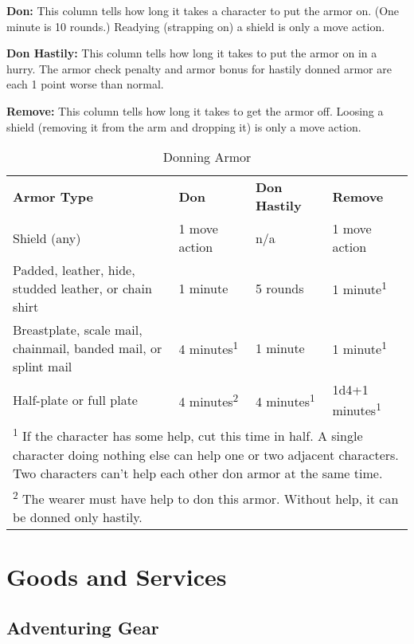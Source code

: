 \textbf{Don:} This column tells how long it takes a character to put the armor 
on. (One minute is 10 rounds.) Readying (strapping on) a shield is only a move 
action.

\textbf{Don Hastily:} This column tells how long it takes to put the armor on in 
a hurry. The armor check penalty and armor bonus for hastily donned armor are each 
1 point worse than normal. 

\textbf{Remove:} This column tells how long it takes to get the armor off. Loosing 
a shield (removing it from the arm and dropping it) is only a move action.


\begin{table}[htb]
\caption{Donning Armor}
\centering
\begin{tabular}{l l l l}
\textbf{Armor Type} & \textbf{Don} & \textbf{Don Hastily} & \textbf{Remove}\\
Shield (any) & 1 move action & n/a & 1 move action\\
Padded, leather, hide, studded leather, or chain shirt & 1 minute & 5 rounds & 1 minute\textsuperscript{1}\\
Breastplate, scale mail, chainmail, banded mail, or splint mail & 4 minutes\textsuperscript{1} & 1 minute & 1 minute\textsuperscript{1}\\
Half-plate or full plate & 4 minutes\textsuperscript{2} & 4 minutes\textsuperscript{1} & 1d4+1 minutes\textsuperscript{1}\\
\multicolumn{4}{p{15cm}}{\textsuperscript{1} If the character has some help, cut this time in half. A single character doing nothing else can help one or two adjacent characters. Two characters can't help each other don armor at the same time.}\\
\multicolumn{4}{p{15cm}}{\textsuperscript{2} The wearer must have help to don this armor. Without help, it can be donned only hastily.}\\
\end{tabular}
\end{table}

\section{Goods and Services}

\subsection{Adventuring Gear}

